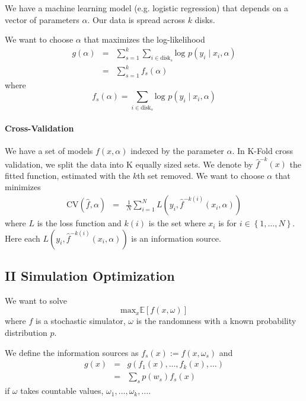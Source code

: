 \documentclass[12pt,english]{article}
\begin{document}
We have a machine learning model (e.g. logistic regression) that depends
on a vector of parameters $\alpha$. Our data is spread across $k$
disks. 

We want to choose $\alpha$ that maximizes the log-likelihood 
\begin{eqnarray*}
g\left(\alpha\right) & = & \sum_{s=1}^{k}\sum_{i\in\mbox{disk}_{s}}\mbox{log }p\left(y_{i}\mid x_{i},\alpha\right)\\
 & = & \sum_{s=1}^{k}f_{s}\left(\alpha\right)
\end{eqnarray*}
where 
\[
f_{s}\left(\alpha\right)=\sum_{i\in\mbox{disk}_{s}}\mbox{log }p\left(y_{i}\mid x_{i},\alpha\right)
\]



\paragraph*{Cross-Validation}

We have a set of models $f\left(x,\alpha\right)$ indexed by the parameter
$\alpha$. In K-Fold cross validation, we split the data into K equally
sized sets. We denote by $\hat{f}^{-k}\left(x\right)$ the fitted
function, estimated with the $k$th set removed. We want to choose
$\alpha$ that minimizes
\begin{eqnarray*}
\mbox{CV}\left(\hat{f},\alpha\right) & = & \frac{1}{N}\sum_{i=1}^{N}L\left(y_{i},\hat{f}^{-k\left(i\right)}\left(x_{i},\alpha\right)\right)
\end{eqnarray*}
where $L$ is the loss function and $k\left(i\right)$ is the set
where $x_{i}$ is for $i\in\left\{ 1,\ldots,N\right\} $. Here each
$L\left(y_{i},\hat{f}^{-k\left(i\right)}\left(x_{i},\alpha\right)\right)$
is an information source.


\subsection*{II Simulation Optimization}

We want to solve 
\[
\mbox{max}_{x}\mathbb{E}\left[f\left(x,\omega\right)\right]
\]
where $f$ is a stochastic simulator, $\omega$ is the randomness
with a known probability distribution $p$.

We define the information sources as $f_{s}\left(x\right):=f\left(x,\omega_{s}\right)$
and 
\begin{eqnarray*}
g\left(x\right) & = & g\left(f_{1}\left(x\right),\ldots,f_{k}\left(x\right),\ldots\right)\\
 & = & \sum_{s}p\left(w_{s}\right)f_{s}\left(x\right)
\end{eqnarray*}
if $\omega$ takes countable values, $\omega_{1},\ldots,\omega_{k},\ldots$. 
\end{document}
